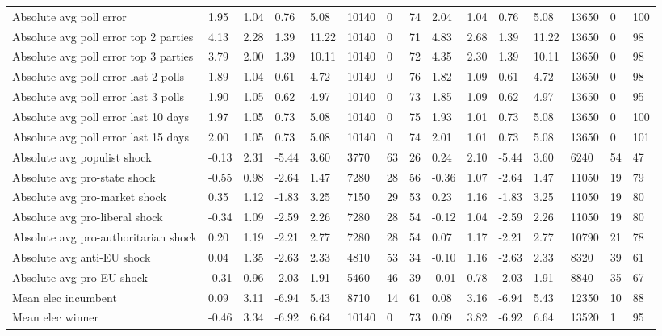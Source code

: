 \begin{longtable}{lllllllllllllll}
Absolute avg poll error & 1.95 & 1.04 & 0.76 & 5.08 & 10140 & 0 & 74 & 2.04 & 1.04 & 0.76 & 5.08 & 13650 & 0 & 100\\
Absolute avg poll error top 2 parties & 4.13 & 2.28 & 1.39 & 11.22 & 10140 & 0 & 71 & 4.83 & 2.68 & 1.39 & 11.22 & 13650 & 0 & 98\\
Absolute avg poll error top 3 parties & 3.79 & 2.00 & 1.39 & 10.11 & 10140 & 0 & 72 & 4.35 & 2.30 & 1.39 & 10.11 & 13650 & 0 & 98\\
\addlinespace
Absolute avg poll error last 2 polls & 1.89 & 1.04 & 0.61 & 4.72 & 10140 & 0 & 76 & 1.82 & 1.09 & 0.61 & 4.72 & 13650 & 0 & 98\\
Absolute avg poll error last 3 polls & 1.90 & 1.05 & 0.62 & 4.97 & 10140 & 0 & 73 & 1.85 & 1.09 & 0.62 & 4.97 & 13650 & 0 & 95\\
Absolute avg poll error last 10 days & 1.97 & 1.05 & 0.73 & 5.08 & 10140 & 0 & 75 & 1.93 & 1.01 & 0.73 & 5.08 & 13650 & 0 & 100\\
Absolute avg poll error last 15 days & 2.00 & 1.05 & 0.73 & 5.08 & 10140 & 0 & 74 & 2.01 & 1.01 & 0.73 & 5.08 & 13650 & 0 & 101\\
Absolute avg populist shock & -0.13 & 2.31 & -5.44 & 3.60 & 3770 & 63 & 26 & 0.24 & 2.10 & -5.44 & 3.60 & 6240 & 54 & 47\\
\addlinespace
Absolute avg pro-state shock & -0.55 & 0.98 & -2.64 & 1.47 & 7280 & 28 & 56 & -0.36 & 1.07 & -2.64 & 1.47 & 11050 & 19 & 79\\
Absolute avg pro-market shock & 0.35 & 1.12 & -1.83 & 3.25 & 7150 & 29 & 53 & 0.23 & 1.16 & -1.83 & 3.25 & 11050 & 19 & 80\\
Absolute avg pro-liberal shock & -0.34 & 1.09 & -2.59 & 2.26 & 7280 & 28 & 54 & -0.12 & 1.04 & -2.59 & 2.26 & 11050 & 19 & 80\\
Absolute avg pro-authoritarian shock & 0.20 & 1.19 & -2.21 & 2.77 & 7280 & 28 & 54 & 0.07 & 1.17 & -2.21 & 2.77 & 10790 & 21 & 78\\
Absolute avg anti-EU shock & 0.04 & 1.35 & -2.63 & 2.33 & 4810 & 53 & 34 & -0.10 & 1.16 & -2.63 & 2.33 & 8320 & 39 & 61\\
\addlinespace
Absolute avg pro-EU shock & -0.31 & 0.96 & -2.03 & 1.91 & 5460 & 46 & 39 & -0.01 & 0.78 & -2.03 & 1.91 & 8840 & 35 & 67\\
Mean elec incumbent & 0.09 & 3.11 & -6.94 & 5.43 & 8710 & 14 & 61 & 0.08 & 3.16 & -6.94 & 5.43 & 12350 & 10 & 88\\
Mean elec winner & -0.46 & 3.34 & -6.92 & 6.64 & 10140 & 0 & 73 & 0.09 & 3.82 & -6.92 & 6.64 & 13520 & 1 & 95\\

\end{longtable}
